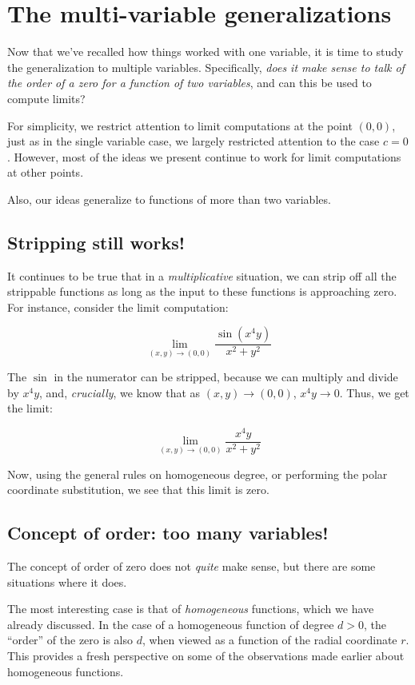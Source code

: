 \documentclass[10pt]{amsart}
\begin{document}
\section{The multi-variable generalizations}

Now that we've recalled how things worked with one variable, it is
time to study the generalization to multiple variables. Specifically,
{\em does it make sense to talk of the order of a zero for a function
of two variables}, and can this be used to compute limits?

For simplicity, we restrict attention to limit computations at the
point $(0,0)$, just as in the single variable case, we largely
restricted attention to the case $c = 0$. However, most of the ideas
we present continue to work for limit computations at other points.

Also, our ideas generalize to functions of more than two variables.
\subsection{Stripping still works!}

It continues to be true that in a {\em multiplicative} situation, we
can strip off all the strippable functions as long as the input to
these functions is approaching zero. For instance, consider the limit
computation:

$$\lim_{(x,y) \to (0,0)} \frac{\sin(x^4y)}{x^2 + y^2}$$

The $\sin$ in the numerator can be stripped, because we can multiply
and divide by $x^4y$, and, {\em crucially}, we know that as $(x,y) \to
(0,0)$, $x^4y \to 0$. Thus, we get the limit:

$$\lim_{(x,y) \to (0,0)} \frac{x^4y}{x^2 + y^2}$$

Now, using the general rules on homogeneous degree, or performing the
polar coordinate substitution, we see that this limit is zero.

\subsection{Concept of order: too many variables!}

The concept of order of zero does not {\em quite} make sense, but
there are some situations where it does.

The most interesting case is that of {\em homogeneous} functions,
which we have already discussed. In the case of a homogeneous function
of degree $d > 0$, the ``order'' of the zero is also $d$, when viewed
as a function of the radial coordinate $r$. This provides a fresh
perspective on some of the observations made earlier about homogeneous
functions.
\end{document}
